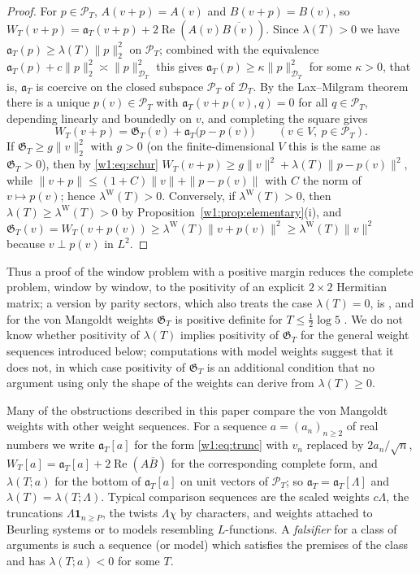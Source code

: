 \documentclass[11pt]{amsart}
\theoremstyle{definition}
\theoremstyle{remark}
\numberwithin{equation}{section}
\DeclareMathOperator{\Rel}{Re}
\newcommand{\PT}{\mathcal{P}_T}                        %
\newcommand{\DT}{\mathcal{D}_T}                        %
\newcommand{\aT}{\mathfrak{a}_T}                       %
\newcommand{\WT}{W_T}                                  %
\newcommand{\lam}{\lambda(T)}                          %
\newcommand{\lamW}{\lambda^{\mathrm W}(T)}             %
\begin{document}
\begin{proof}
For $p\in\PT$, $A(v+p)=A(v)$ and $B(v+p)=B(v)$, so
$\WT(v+p)=\aT(v+p)+2\Rel(A(v)\overline{B(v)})$. Since $\lam>0$ we have
$\aT(p)\ge\lam\|p\|_2^2$ on $\PT$; combined with the equivalence
$\aT(p)+c\|p\|_2^2\asymp\|p\|_{\DT}^2$ this gives
$\aT(p)\ge\kappa\|p\|_{\DT}^2$ for some $\kappa>0$, that is, $\aT$ is coercive on
the closed subspace $\PT$ of $\DT$. By the Lax--Milgram theorem there is a
unique $p(v)\in\PT$ with $\aT(v+p(v),q)=0$ for all $q\in\PT$, depending
linearly and boundedly on $v$, and completing the square gives
\begin{equation}\label{w1:eq:schur}
  \WT(v+p)=\mathfrak G_T(v)+\aT\bigl(p-p(v)\bigr)\qquad(v\in V,\ p\in\PT).
\end{equation}
If $\mathfrak G_T\ge g\|v\|_2^2$ with $g>0$ (on the finite-dimensional $V$
this is the same as $\mathfrak G_T>0$), then by \eqref{w1:eq:schur}
$\WT(v+p)\ge g\|v\|^2+\lam\|p-p(v)\|^2$, while
$\|v+p\|\le(1+C)\|v\|+\|p-p(v)\|$ with $C$ the norm of $v\mapsto p(v)$; hence
$\lamW>0$. Conversely, if $\lamW>0$, then $\lam\ge\lamW>0$ by
Proposition~\ref{w1:prop:elementary}(i), and
$\mathfrak G_T(v)=\WT(v+p(v))\ge\lamW\|v+p(v)\|^2\ge\lamW\|v\|^2$ because
$v\perp p(v)$ in $L^2$.
\end{proof}

Thus a proof of the window problem with a positive margin reduces the
complete problem, window by window, to the positivity of an explicit
$2\times2$ Hermitian matrix; a version by parity sectors, which also treats
the case $\lam=0$, is \cite[Theorem~8.6]{P46}, and for the von Mangoldt
weights $\mathfrak G_T$ is positive definite for $T\le\frac12\log5$
\cite[Theorem~9.1]{P46}. We do not know whether positivity of $\lam$
implies positivity of $\mathfrak G_T$ for the general weight sequences
introduced below; computations with model weights suggest that it does not,
in which case positivity of $\mathfrak G_T$ is an additional condition that
no argument using only the shape of the weights can derive from $\lam\ge0$.

Many of the obstructions described in this paper compare the von Mangoldt
weights with other weight sequences. For a sequence $a=(a_n)_{n\ge2}$ of real
numbers we write $\aT[a]$ for the form \eqref{w1:eq:trunc} with $v_n$ replaced
by $2a_n/\sqrt n$, $W_T[a]=\aT[a]+2\Rel(A\overline B)$ for the corresponding
complete form, and $\lambda(T;a)$ for the bottom of $\aT[a]$ on unit vectors
of $\PT$; so $\aT=\aT[\Lambda]$ and $\lam=\lambda(T;\Lambda)$. Typical
comparison sequences are the scaled weights $c\Lambda$, the truncations
$\Lambda\mathbf 1_{n\ge P}$, the twists $\Lambda\chi$ by characters, and weights
attached to Beurling systems or to models resembling $L$-functions. A
\emph{falsifier} for a class of arguments is such a sequence (or model) which
satisfies the premises of the class and has $\lambda(T;a)<0$ for some $T$.
\end{document}
